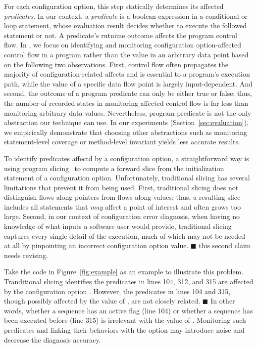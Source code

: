 For each configuration option, this step statically determines
its affected \textit{predicates}. In our context, a \textit{predicate}
is a boolean expression in a conditional or loop statement, whose evaluation result
decides whether to execute the followed statement or not.
A predicate's rutnime outcome affects the program control flow.
In \ourtool, we focus on identifying and monitoring 
configuration option-affected control flow in a program
rather than the value in an arbitrary data point based on the
following two observations. First, control flow 
often propagates the majority of configuration-related affects
and is essential to a program's execution path, while
the value of a specific data flow point is largely input-dependent.
And second, the outcome of a program predicate can only be
either true or false; thus, the number of recorded states in monitoring
affected control flow is far less than monitoring arbitrary
data values.  Nevertheless, program predicate is not the only
abstraction our technique can use. In our experiments (Section~\ref{sec:evaluation}),
we empirically demonstrate that choosing other abstractions
such as monitoring statement-level coverage
or method-level invariant yields less accurate results.


To identify predicates affectd by a configuration option, a straightforward
way is using program slicing~\cite{Horwitz:1988} to compute
a forward slice from the initialization statement of a
configuration option. Unfortunately, traditional slicing has
several limitations that prevent it from being used.
First, traditional slicing does not distinguish flows along
pointers from flows along values; thus, a resulting slice includes all statements that
\textit{may} affect a point of interest and often grows too large. Second,
in our context of configuration error diagnosis,
when having no knowledge of what inputs a software user would provide,
traditional slicing captures every single detail of the execution,
much of which may not be needed at all by pinpointing an incorrect
configuration option value. $\blacksquare$ this second claim needs revising.

Take the code in Figure~\ref{fig:example} as an example to illustrate
this problem.  Tranditional slicing identifies the predicates
in lines 104, 312, and 315 are affected by the configuration option .
However, the predicates in lines 104 and 315, though possibly
affected by the value of , are not closely related. $\blacksquare$
In other words, whether a sequence has an active flag (line 104) or
whether a sequence has been executed before (line 315)
is irrelevant with the value of . Monitoring
such predicates and linking their behaviors with the 
option may introduce noise and decrease the diagnosis accuracy.

